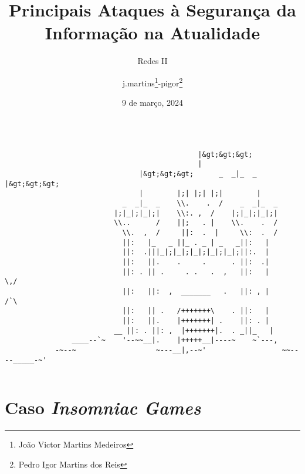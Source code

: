 \documentclass[bookmarks=false,aspectratio=169,9pt]{beamer}
\date{9 de março, 2024}
\title[Seminário - Redes II]{Principais Ataques à Segurança da Informação na Atualidade}
\institute[Pontifícia Universidade Católica de Minas Gerais]{@pucminas}
\author{j.martins\footnote{João Victor Martins Medeiros}-pigor\footnote{Pedro Igor Martins dos Reis}}
\subtitle{Redes II}
\begin{document}
\begin{frame}[fragile]
	\begin{columns}
		\begin{column}{\textwidth}
			\begin{verbatim}
                                              |&gt;&gt;&gt;
                                              |
                                |&gt;&gt;&gt;      _  _|_  _         |&gt;&gt;&gt;
                                |        |;| |;| |;|        |
                            _  _|_  _    \\.    .  /    _  _|_  _
                          |;|_|;|_|;|    \\:. ,  /    |;|_|;|_|;|
                          \\..      /    ||;   . |    \\.    .  /
                            \\.  ,  /     ||:  .  |     \\:  .  /
                            ||:   |_   _ ||_ . _ | _   _||:   |
                            ||:  .|||_|;|_|;|_|;|_|;|_|;||:.  |
                            ||:   ||.    .     .      . ||:  .|
                            ||: . || .     . .   .  ,   ||:   |       \,/
                            ||:   ||:  ,  _______   .   ||: , |            /`\
                            ||:   || .   /+++++++\    . ||:   |
                            ||:   ||.    |+++++++| .    ||: . |
                          __ ||: . ||: ,  |+++++++|.  . _||_   |
                ____--`~    '--~~__|.    |+++++__|----~    ~`---,
            -~--~                   ~---__|,--~'                  ~~----_____-~'
\end{verbatim}
		\end{column}
	\end{columns}
\end{frame}
\begin{frame}
	\titlepage
\end{frame}
\section{Caso \textit{Insomniac Games}}
\end{document}
